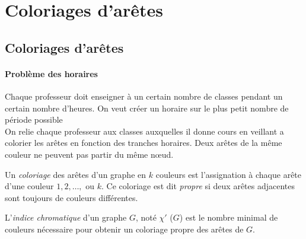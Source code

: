 \section{Coloriages d'arêtes}
\subsection{Coloriages d'arêtes}

\paragraph{Problème des horaires}
Chaque professeur doit enseigner à un certain nombre de classes pendant un certain nombre d'heures. On veut créer
un horaire sur le plus petit nombre de période possible
\\On relie chaque professeur aux classes auxquelles il donne cours en veillant a colorier les arêtes en fonction des tranches horaires. Deux arêtes de la même couleur ne peuvent pas partir du même nœud.

\begin{mydef}
  Un \emph{coloriage} des arêtes d’un graphe en $k$ couleurs est l’assignation à chaque arête d’une couleur $1, 2, \ldots,$ ou $k$.
  Ce coloriage est dit \emph{propre} si deux arêtes adjacentes sont toujours de couleurs différentes.
\end{mydef}

\begin{mydef}
  L’\emph{indice chromatique} d’un graphe $G$, noté $\chi '$ ($G$) est le nombre minimal de couleurs nécessaire pour obtenir un coloriage propre des arêtes de $G$.
\end{mydef}


